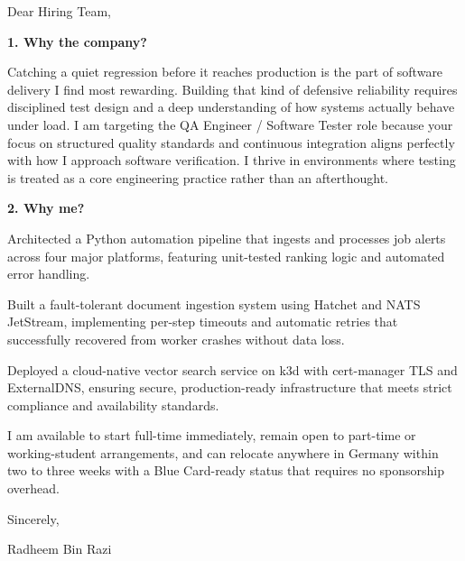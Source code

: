 \documentclass[11pt,a4paper]{coverletter}
\begin{document}

\opening{Dear Hiring Team,}

\vspace{8pt}\noindent\textbf{1. Why the company?}\par\vspace{3pt}

Catching a quiet regression before it reaches production is the part of software delivery I find most rewarding. Building that kind of defensive reliability requires disciplined test design and a deep understanding of how systems actually behave under load. I am targeting the QA Engineer / Software Tester role because your focus on structured quality standards and continuous integration aligns perfectly with how I approach software verification. I thrive in environments where testing is treated as a core engineering practice rather than an afterthought.

\vspace{8pt}\noindent\textbf{2. Why me?}\par\vspace{3pt}

\bullets

  \item Architected a Python automation pipeline that ingests and processes job alerts across four major platforms, featuring unit-tested ranking logic and automated error handling.

  \item Built a fault-tolerant document ingestion system using Hatchet and NATS JetStream, implementing per-step timeouts and automatic retries that successfully recovered from worker crashes without data loss.

  \item Deployed a cloud-native vector search service on k3d with cert-manager TLS and ExternalDNS, ensuring secure, production-ready infrastructure that meets strict compliance and availability standards.

\bulletsend

I am available to start full-time immediately, remain open to part-time or working-student arrangements, and can relocate anywhere in Germany within two to three weeks with a Blue Card-ready status that requires no sponsorship overhead.

\closing{Sincerely,}{Radheem Bin Razi}

\clearpage
{}
\end{document}
